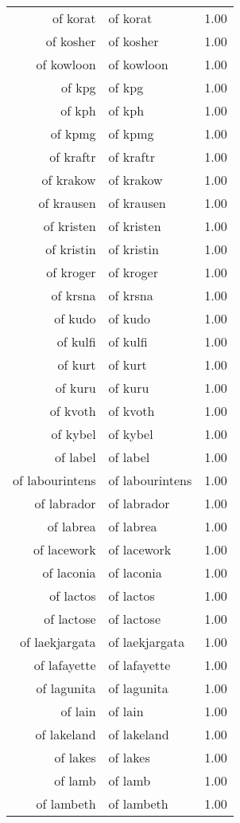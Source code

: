 \begin{table}[ht]
\begin{tabular}{rlr}
  of korat & of korat & 1.00 \\ 
  of kosher & of kosher & 1.00 \\ 
  of kowloon & of kowloon & 1.00 \\ 
  of kpg & of kpg & 1.00 \\ 
  of kph & of kph & 1.00 \\ 
  of kpmg & of kpmg & 1.00 \\ 
  of kraftr & of kraftr & 1.00 \\ 
  of krakow & of krakow & 1.00 \\ 
  of krausen & of krausen & 1.00 \\ 
  of kristen & of kristen & 1.00 \\ 
  of kristin & of kristin & 1.00 \\ 
  of kroger & of kroger & 1.00 \\ 
  of krsna & of krsna & 1.00 \\ 
  of kudo & of kudo & 1.00 \\ 
  of kulfi & of kulfi & 1.00 \\ 
  of kurt & of kurt & 1.00 \\ 
  of kuru & of kuru & 1.00 \\ 
  of kvoth & of kvoth & 1.00 \\ 
  of kybel & of kybel & 1.00 \\ 
  of label & of label & 1.00 \\ 
  of labourintens & of labourintens & 1.00 \\ 
  of labrador & of labrador & 1.00 \\ 
  of labrea & of labrea & 1.00 \\ 
  of lacework & of lacework & 1.00 \\ 
  of laconia & of laconia & 1.00 \\ 
  of lactos & of lactos & 1.00 \\ 
  of lactose & of lactose & 1.00 \\ 
  of laekjargata & of laekjargata & 1.00 \\ 
  of lafayette & of lafayette & 1.00 \\ 
  of lagunita & of lagunita & 1.00 \\ 
  of lain & of lain & 1.00 \\ 
  of lakeland & of lakeland & 1.00 \\ 
  of lakes & of lakes & 1.00 \\ 
  of lamb & of lamb & 1.00 \\ 
  of lambeth & of lambeth & 1.00 \\ 

\end{tabular}
\end{table}
